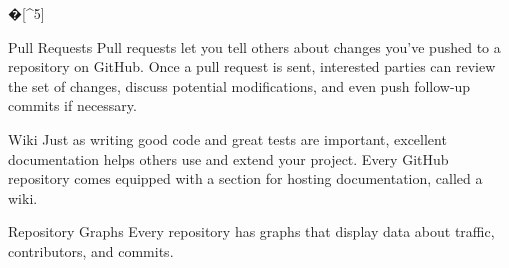  �[^5]

Pull Requests
Pull requests let you tell others about changes you've pushed to a repository on GitHub. Once a pull request is sent, interested parties can review the set of changes, discuss potential modifications, and even push follow-up commits if necessary.



Wiki
Just as writing good code and great tests are important, excellent documentation helps others use and extend your project.
Every GitHub repository comes equipped with a section for hosting documentation, called a wiki.



Repository Graphs
Every repository has graphs that display data about traffic, contributors, and commits.



